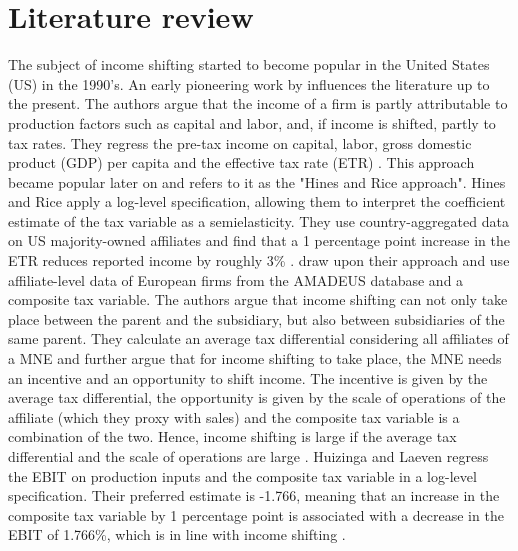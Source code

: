 \documentclass[10pt,twocolumn,oneside,cmyk]{article}
\begin{document}
\section{Literature review} \label{sec:Literature review}
The subject of income shifting started to become popular in the United States (US) in the 1990's. An early pioneering work by \textcite{hines_fiscal_1994} influences the literature up to the present. The authors argue that the income of a firm is partly attributable to production factors such as capital and labor, and, if income is shifted, partly to tax rates. They regress the pre-tax income on capital, labor, gross domestic product (GDP) per capita and the effective tax rate (ETR) \parencite[161]{hines_fiscal_1994}. This approach became popular later on and \textcite[423]{dharmapala_what_2014} refers to it as the "Hines and Rice approach". Hines and Rice apply a log-level specification, allowing them to interpret the coefficient estimate of the tax variable as a semielasticity. They use country-aggregated data on US majority-owned affiliates and find that a 1 percentage point increase in the ETR reduces reported income by roughly 3\% \parencite[161-162]{hines_fiscal_1994}. \textcite{huizinga_international_2008} draw upon their approach and use affiliate-level data of European firms from the AMADEUS database and a composite tax variable. The authors argue that income shifting can not only take place between the parent and the subsidiary, but also between subsidiaries of the same parent. They calculate an average tax differential considering all affiliates of a MNE and further argue that for income shifting to take place, the MNE needs an incentive and an opportunity to shift income. The incentive is given by the average tax differential, the opportunity is given by the scale of operations of the affiliate (which they proxy with sales) and the composite tax variable is a combination of the two. Hence, income shifting is large if the average tax differential and the scale of operations are large \parencite[1168-1169]{huizinga_international_2008}. Huizinga and Laeven regress the EBIT on production inputs and the composite tax variable in a log-level specification. Their preferred estimate is -1.766, meaning that an increase in the composite tax variable by 1 percentage point is associated with a decrease in the EBIT of 1.766\%, which is in line with income shifting \parencite[1177]{huizinga_international_2008}.
\end{document}
